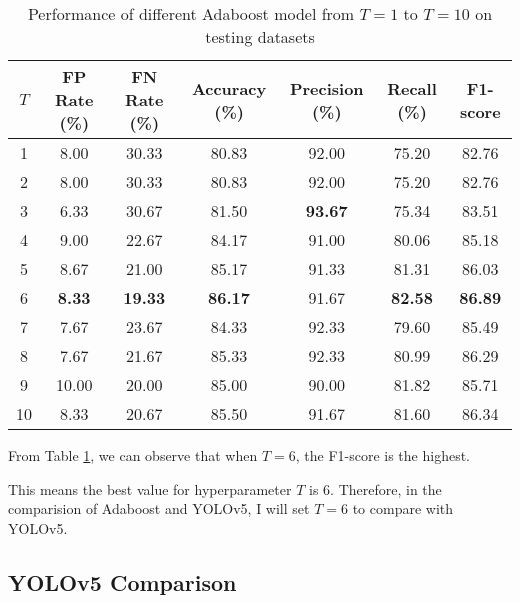 \documentclass{article}[12pt]
\begin{document}
\begin{table}[H]
    \centering
    \caption{Performance of different Adaboost model from $T=1$ to $T=10$ on testing datasets}
    \begin{tabular}{@{}ccccccc@{}}
        \toprule
        $T$  & FP Rate (\%)  & FN Rate (\%)   & Accuracy (\%)  & Precision (\%)   & Recall (\%)      & F1-score  \\ \midrule
        1  & 8.00          & 30.33          & 80.83          & 92.00         & 75.20         & 82.76         \\
        2  & 8.00          & 30.33          & 80.83          & 92.00         & 75.20         & 82.76         \\
        3  & 6.33          & 30.67          & 81.50          & \textbf{93.67} & 75.34         & 83.51         \\
        4  & 9.00          & 22.67          & 84.17          & 91.00         & 80.06         & 85.18         \\
        5  & 8.67          & 21.00          & 85.17          & 91.33         & 81.31         & 86.03         \\
        6  & \textbf{8.33} & \textbf{19.33} & \textbf{86.17} & 91.67         & \textbf{82.58} & \textbf{86.89} \\
        7  & 7.67          & 23.67          & 84.33          & 92.33         & 79.60         & 85.49         \\
        8  & 7.67          & 21.67          & 85.33          & 92.33         & 80.99         & 86.29         \\
        9  & 10.00         & 20.00          & 85.00          & 90.00         & 81.82         & 85.71         \\
        10 & 8.33          & 20.67          & 85.50          & 91.67         & 81.60         & 86.34         \\ \bottomrule
    \end{tabular}
    \label{tab:ada_test}    
\end{table}

From Table \ref{tab:ada_test}, we can observe that when $T=6$, the F1-score is the highest.

This means the best value for hyperparameter $T$ is 6. Therefore, in the comparision of Adaboost
and YOLOv5, I will set $T=6$ to compare with YOLOv5.
\subsection{YOLOv5 Comparison} \label{subsec:yolo_comp}
\end{document}
